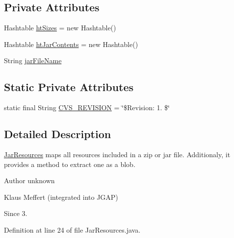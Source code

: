 \subsection*{Private Attributes}
\begin{DoxyCompactItemize}
\item 
Hashtable \hyperlink{classorg_1_1jgap_1_1util_1_1_jar_resources_ac127982a8f4ee27585abfa736cb3fc03}{ht\-Sizes} = new Hashtable()
\item 
Hashtable \hyperlink{classorg_1_1jgap_1_1util_1_1_jar_resources_a49a4dfbb28f5a8d1ce4aebf4e2d93b84}{ht\-Jar\-Contents} = new Hashtable()
\item 
String \hyperlink{classorg_1_1jgap_1_1util_1_1_jar_resources_a2ff183e8160357870aabbb7ff4f75000}{jar\-File\-Name}
\end{DoxyCompactItemize}
\subsection*{Static Private Attributes}
\begin{DoxyCompactItemize}
\item 
static final String \hyperlink{classorg_1_1jgap_1_1util_1_1_jar_resources_a833854120ecb90e29a530677d1a56614}{C\-V\-S\-\_\-\-R\-E\-V\-I\-S\-I\-O\-N} = \char`\"{}\$Revision\-: 1. \$\char`\"{}
\end{DoxyCompactItemize}


\subsection{Detailed Description}
\hyperlink{classorg_1_1jgap_1_1util_1_1_jar_resources}{Jar\-Resources} maps all resources included in a zip or jar file. Additionaly, it provides a method to extract one as a blob.

\begin{DoxyAuthor}{Author}
unknown 

Klaus Meffert (integrated into J\-G\-A\-P) 
\end{DoxyAuthor}
\begin{DoxySince}{Since}
3. 
\end{DoxySince}


Definition at line 24 of file Jar\-Resources.\-java.



